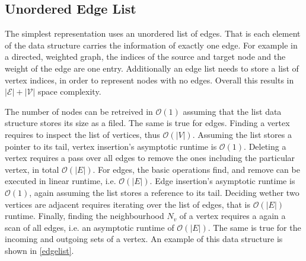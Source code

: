         \subsection*{Unordered Edge List}
            The simplest representation uses an unordered list of edges. 
            That is each element of the data structure carries the information of exactly one edge. 
            For example in a directed, weighted graph, the indices of the source and target node and the weight of the edge are one entry. 
            Additionally an edge list needs to store a list of vertex indices, in order to represent nodes with no edges.
            Overall this results in $\mathcal{|E| + |V|}$ space complexity.
            
            The number of nodes can be retreived in $\mathcal{O}(1)$ assuming that the list data structure stores its size as a filed. 
            The same is true for edges.
            Finding a vertex requires to inspect the list of vertices, thus $\mathcal{O}(|V|)$. 
            Assuming the list stores a pointer to its tail, vertex insertion's asymptotic runtime is $\mathcal{O}(1)$. 
            Deleting a vertex requires a pass over all edges to remove the ones including the particular vertex, in total $\mathcal{O}(|E|)$.
            For edges, the basic operations find, and remove can be executed in linear runtime, i.e. $\mathcal{O}(|E|)$.
            Edge insertion's asymptotic runtime is $\mathcal{O}(1)$, again assuming the list stores a reference to its tail. 
            Deciding wether two vertices are adjacent requires iterating over the list of edges, that is 
            $\mathcal{O}(|E|)$ runtime.
            Finally, finding the neighbourhood $N_v$ of a vertex requires a again a scan of all edges, i.e. an asymptotic runtime of $\mathcal{O}(|E|)$. 
            The same is true for the incoming and outgoing sets of a vertex.
            An example of this data structure is shown in \ref{edgelist}.
            
